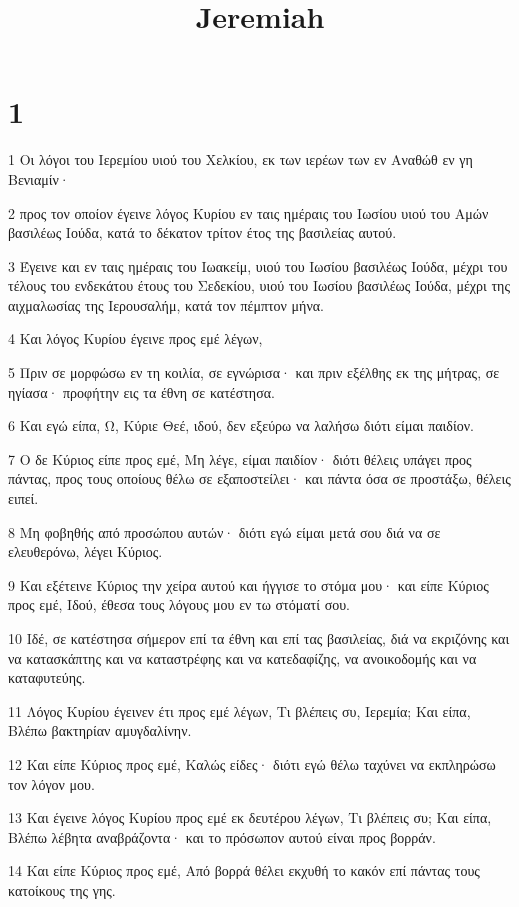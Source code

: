 

\title{Jeremiah}


\chapter{1}

\par 1 Οι λόγοι του Ιερεμίου υιού του Χελκίου, εκ των ιερέων των εν Αναθώθ εν γη Βενιαμίν·
\par 2 προς τον οποίον έγεινε λόγος Κυρίου εν ταις ημέραις του Ιωσίου υιού του Αμών βασιλέως Ιούδα, κατά το δέκατον τρίτον έτος της βασιλείας αυτού.
\par 3 Έγεινε και εν ταις ημέραις του Ιωακείμ, υιού του Ιωσίου βασιλέως Ιούδα, μέχρι του τέλους του ενδεκάτου έτους του Σεδεκίου, υιού του Ιωσίου βασιλέως Ιούδα, μέχρι της αιχμαλωσίας της Ιερουσαλήμ, κατά τον πέμπτον μήνα.
\par 4 Και λόγος Κυρίου έγεινε προς εμέ λέγων,
\par 5 Πριν σε μορφώσω εν τη κοιλία, σε εγνώρισα· και πριν εξέλθης εκ της μήτρας, σε ηγίασα· προφήτην εις τα έθνη σε κατέστησα.
\par 6 Και εγώ είπα, Ω, Κύριε Θεέ, ιδού, δεν εξεύρω να λαλήσω διότι είμαι παιδίον.
\par 7 Ο δε Κύριος είπε προς εμέ, Μη λέγε, είμαι παιδίον· διότι θέλεις υπάγει προς πάντας, προς τους οποίους θέλω σε εξαποστείλει· και πάντα όσα σε προστάξω, θέλεις ειπεί.
\par 8 Μη φοβηθής από προσώπου αυτών· διότι εγώ είμαι μετά σου διά να σε ελευθερόνω, λέγει Κύριος.
\par 9 Και εξέτεινε Κύριος την χείρα αυτού και ήγγισε το στόμα μου· και είπε Κύριος προς εμέ, Ιδού, έθεσα τους λόγους μου εν τω στόματί σου.
\par 10 Ιδέ, σε κατέστησα σήμερον επί τα έθνη και επί τας βασιλείας, διά να εκριζόνης και να κατασκάπτης και να καταστρέφης και να κατεδαφίζης, να ανοικοδομής και να καταφυτεύης.
\par 11 Λόγος Κυρίου έγεινεν έτι προς εμέ λέγων, Τι βλέπεις συ, Ιερεμία; Και είπα, Βλέπω βακτηρίαν αμυγδαλίνην.
\par 12 Και είπε Κύριος προς εμέ, Καλώς είδες· διότι εγώ θέλω ταχύνει να εκπληρώσω τον λόγον μου.
\par 13 Και έγεινε λόγος Κυρίου προς εμέ εκ δευτέρου λέγων, Τι βλέπεις συ; Και είπα, Βλέπω λέβητα αναβράζοντα· και το πρόσωπον αυτού είναι προς βορράν.
\par 14 Και είπε Κύριος προς εμέ, Από βορρά θέλει εκχυθή το κακόν επί πάντας τους κατοίκους της γης.
